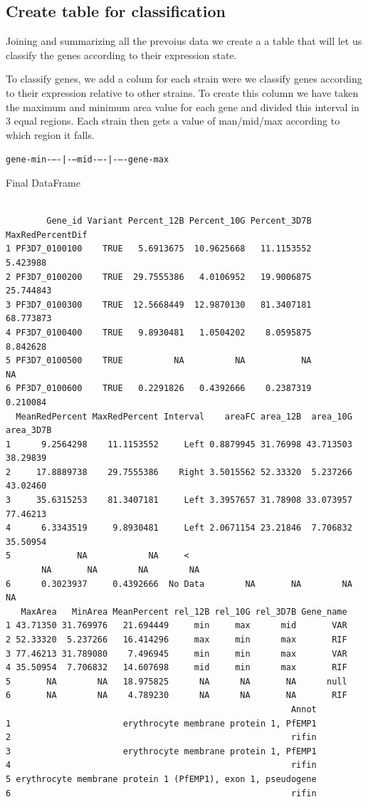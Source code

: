 \documentclass[11pt]{article}
\begin{document}
\subsection{Create table for classification}
\label{sec:orgd4f757c}

Joining and summarizing all the prevoius data we create a a table that will let us classify the genes according to their expression state.

To classify genes, we add a colum for each strain were we classify genes according to their expression relative to other strains.
To create this column we have taken the maximum and minimum area value for each gene and divided this interval in 3 equal regions. Each strain then gets a value of man/mid/max according to which region it falls.

\texttt{gene-min-{}--{}-|-{}--mid-{}--{}-|-{}--{}-gene-max}

Final DataFrame
\begin{verbatim}

        Gene_id Variant Percent_12B Percent_10G Percent_3D7B MaxRedPercentDif
1 PF3D7_0100100    TRUE   5.6913675  10.9625668   11.1153552         5.423988
2 PF3D7_0100200    TRUE  29.7555386   4.0106952   19.9006875        25.744843
3 PF3D7_0100300    TRUE  12.5668449  12.9870130   81.3407181        68.773873
4 PF3D7_0100400    TRUE   9.8930481   1.0504202    8.0595875         8.842628
5 PF3D7_0100500    TRUE          NA          NA           NA               NA
6 PF3D7_0100600    TRUE   0.2291826   0.4392666    0.2387319         0.210084
  MeanRedPercent MaxRedPercent Interval    areaFC area_12B  area_10G area_3D7B
1      9.2564298    11.1153552     Left 0.8879945 31.76998 43.713503  38.29839
2     17.8889738    29.7555386    Right 3.5015562 52.33320  5.237266  43.02460
3     35.6315253    81.3407181     Left 3.3957657 31.78908 33.073957  77.46213
4      6.3343519     9.8930481     Left 2.0671154 23.21846  7.706832  35.50954
5             NA            NA     <
       NA       NA        NA        NA
6      0.3023937     0.4392666  No Data        NA       NA        NA        NA
   MaxArea   MinArea MeanPercent rel_12B rel_10G rel_3D7B Gene_name
1 43.71350 31.769976   21.694449     min     max      mid       VAR
2 52.33320  5.237266   16.414296     max     min      max       RIF
3 77.46213 31.789080    7.496945     min     min      max       VAR
4 35.50954  7.706832   14.607698     mid     min      max       RIF
5       NA        NA   18.975825      NA      NA       NA      null
6       NA        NA    4.789230      NA      NA       NA       RIF
                                                        Annot
1                      erythrocyte membrane protein 1, PfEMP1
2                                                       rifin
3                      erythrocyte membrane protein 1, PfEMP1
4                                                       rifin
5 erythrocyte membrane protein 1 (PfEMP1), exon 1, pseudogene
6                                                       rifin
\end{verbatim}
\end{document}
